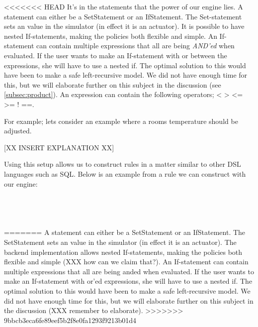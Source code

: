<<<<<<< HEAD
It's in the statements that the power of our engine lies. A statement can either be a SetStatement or an IfStatement. The Set-statement sets an value in the simulator (in effect it is an actuator). It is possible to have nested If-statements, making the policies both flexible and simple. An If-statement can contain multiple expressions that all are being \textit{AND'ed} when evaluated. If the user wants to make an If-statement with or between the expressions, she will have to use a nested if. The optimal solution to this would have been to make a safe left-recursive model. We did not have enough time for this, but we will elaborate further on this subject in the discussion (see \ref{subsec:product}). An expression can contain the following operators; < > <= >= ! ==. 

For example; lets consider an example where a rooms temperature should be adjusted.

[XX INSERT EXPLANATION XX]

Using this setup allows us to construct rules in a matter similar to other DSL languages such as SQL. Below is an example from a rule we can construct with our engine:
\\
\\
\\
\\
\\
%
%
%
=======
A statement can either be a SetStatement or an IfStatement. The SetStatement sets an value in the simulator (in effect it is an actuator). The backend implementation allows nested If-statements, making the policies both flexible and simple (XXX how can we claim that?). An If-statement can contain multiple expressions that all are being anded when evaluated. If the user wants to make an If-statement with or'ed expressions, she will have to use a nested if. The optimal solution to this would have been to make a safe left-recursive model. We did not have enough time for this, but we will elaborate further on this subject in the discussion (XXX remember to elaborate). 
>>>>>>> 9bbcb3eca6fe89eef5b2f8e0fa1293f9213b01d4

